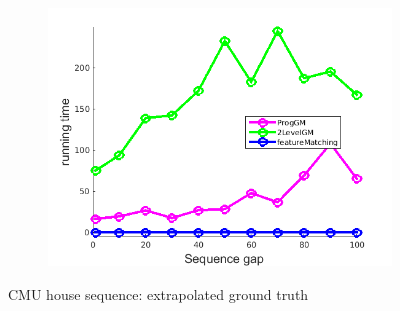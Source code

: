 \documentclass[
	fontsize=12pt,
	paper=a4,
	twoside=false,
	numbers=noenddot,
	plainheadsepline,
	toc=listof,
	toc=bibliography
]{scrartcl}
\begin{document}
\begin{figure}[h]
\begin{subfigure}[b]{0.3\textwidth}
	\end{subfigure} 
	\begin{subfigure}[b]{0.3\textwidth}
		\centering
		\includegraphics[scale=0.25]{"fig_ver2608/RealImages/HouseSeq/no_descr/using_cpd_afftrafo/solution/performance/time"}  
	\end{subfigure} 	
	\caption{CMU house sequence: extrapolated ground truth}
\end{figure}
\FloatBarrier
\vspace{-20pt}
\end{document}
